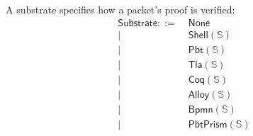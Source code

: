 \begin{definition}[Substrate]
A substrate specifies how a packet's proof is verified:
\begin{align*}
\mathsf{Substrate} ::= \; & \mathsf{None} \\
  \mid\; & \mathsf{Shell}(\mathbb{S}) \\
  \mid\; & \mathsf{Pbt}(\mathbb{S}) \\
  \mid\; & \mathsf{Tla}(\mathbb{S}) \\
  \mid\; & \mathsf{Coq}(\mathbb{S}) \\
  \mid\; & \mathsf{Alloy}(\mathbb{S}) \\
  \mid\; & \mathsf{Bpmn}(\mathbb{S}) \\
  \mid\; & \mathsf{PbtPrism}(\mathbb{S})
\end{align*}
\end{definition}